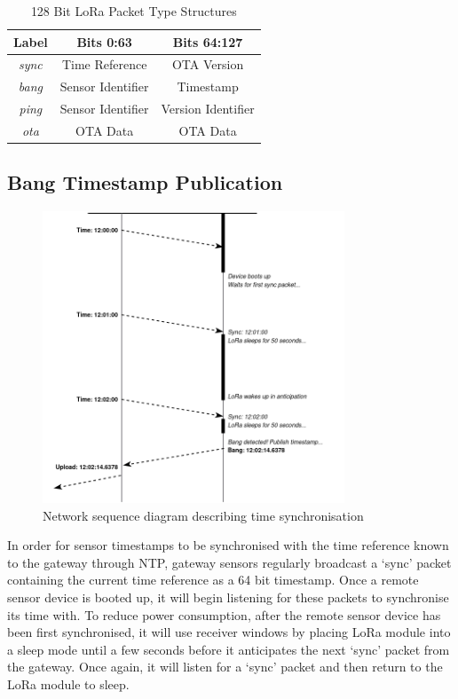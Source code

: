 \documentclass[conference]{IEEEtran}
\begin{document}
\begin{table}[ht]
\caption{128 Bit LoRa Packet Type Structures}
\begin{center}
\begin{tabular}{|c|c|c|}
\hline
\textbf{Label} & \textbf{Bits 0:63} & \textbf{Bits 64:127} \\
\hline
\textit{sync} & Time Reference & OTA Version \\
\hline
\textit{bang} & Sensor Identifier & Timestamp \\
\hline
\textit{ping} & Sensor Identifier & Version Identifier \\
\hline
\textit{ota} & OTA Data & OTA Data \\
\hline
\end{tabular}
\label{packet_table}
\end{center}
\end{table}

\subsection{Bang Timestamp Publication}

\begin{figure}[ht]
\centerline{\includegraphics[width=90mm]{images/ping.png}}
\caption{Network sequence diagram describing time synchronisation}
\label{ping_figure}
\end{figure}

In order for sensor timestamps to be synchronised with the time reference known to the gateway through NTP, gateway sensors regularly broadcast a `sync' packet containing the current time reference as a 64 bit timestamp. Once a remote sensor device is booted up, it will begin listening for these packets to synchronise its time with. To reduce power consumption, after the remote sensor device has been first synchronised, it will use receiver windows by placing LoRa module into a sleep mode until a few seconds before it anticipates the next `sync' packet from the gateway. Once again, it will listen for a `sync' packet and then return to the LoRa module to sleep.
\end{document}
